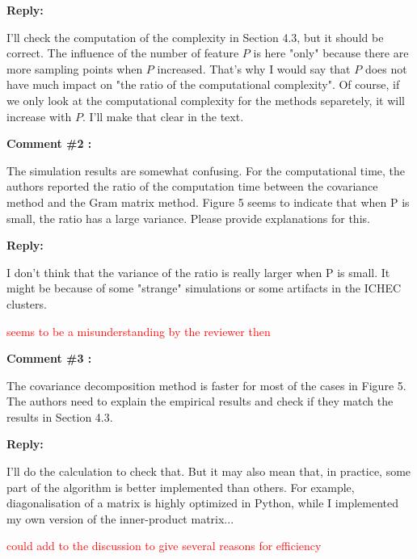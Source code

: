 \documentclass[11pt]{article}
\begin{document}
\medskip

\normalfont

\textbf{Reply:} 

I'll check the computation of the complexity in Section 4.3, but it should be correct.
The influence of the number of feature $P$ is here "only" because there are more sampling points when $P$ increased. That's why I would say that $P$ does not have much impact on "the ratio of the computational complexity". Of course, if we only look at the computational complexity for the methods separetely, it will increase with $P$. I'll make that clear in the text.

\bigskip

\itshape


\textbf{Comment \#2 :}

The simulation results are somewhat confusing. For the computational time, the authors reported the ratio of the computation time between the covariance method and the Gram matrix method. Figure 5 seems to indicate that when P is small, the ratio has a large variance. Please provide explanations for this.

\medskip

\normalfont

\textbf{Reply:} 

I don't think that the variance of the ratio is really larger when P is small. It might be because of some "strange" simulations or some artifacts in the ICHEC clusters.

\textcolor{red}{seems to be a misunderstanding by the reviewer then}


\bigskip

\itshape


\textbf{Comment \#3 :}

The covariance decomposition method is faster for most of the cases in Figure 5. The authors need to explain the empirical results and check if they match the results in Section 4.3.

\medskip

\normalfont

\textbf{Reply:} 

I'll do the calculation to check that. But it may also mean that, in practice, some part of the algorithm is better implemented than others. For example, diagonalisation of a matrix is highly optimized in Python, while I implemented my own version of the inner-product matrix...

\textcolor{red}{could add to the discussion to give several reasons for efficiency}
\end{document}
